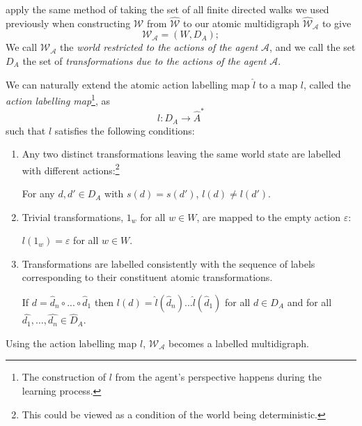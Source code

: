  apply the same method of taking the set of all finite directed walks we used previously when constructing $\mathscr{W}$ from $\hat{\mathscr{W}}$ to our atomic multidigraph $\hat{\mathscr{W}}_{\mathscr{A}}$ to give
\begin{equation}
    \mathscr{W}_{\mathscr{A}} = (W, D_{A});
\end{equation}
We call $\mathscr{W}_{\mathscr{A}}$ the \emph{world restricted to the actions of the agent $\mathscr{A}$}, and we call the set $D_{A}$ the set of \emph{transformations due to the actions of the agent $\mathscr{A}$}.

We can naturally extend the atomic action labelling map $\hat{l}$ to a map $l$, called the \emph{action labelling map}\footnote{
    The construction of $l$ from the agent's perspective happens during the learning process.
}, as
\begin{equation}
    l: D_{A} \to \hat{A}^{*}
\end{equation}
such that $l$ satisfies the following conditions:
\begin{enumerate}
    \item Any two distinct transformations leaving the same world state are labelled with different actions:\footnote{
    This could be viewed as a condition of the world being deterministic.
    }
    \begin{actioncondition}[Uniqueness]\label{actcon:action_gives_single_outcome}
      For any $d,d' \in D_{A}$ with $s(d)=s(d')$, $l(d) \neq l(d')$.
    \end{actioncondition}

    \item Trivial transformations, $1_{w}$ for all $w \in W$, are mapped to the empty action $\varepsilon$:
    \begin{actioncondition}[Identity]\label{actcon:trivial_transformations_mapped_to_empty_sequence}
      $l(1_{w}) = \varepsilon$ for all $w \in W$.
    \end{actioncondition}

    \item Transformations are labelled consistently with the sequence of labels corresponding to their constituent atomic transformations.
    \begin{actioncondition}\label{actcon:composition_consistency}
      If $d = \hat{d}_{n} \circ ... \circ \hat{d}_{1}$ then $l(d) = \hat{l}(\hat{d}_{n}) ... \hat{l}(\hat{d}_{1})$ for all $d \in D_{A}$ and for all $\hat{d_{1}}, \dots , \hat{d_{n}} \in \hat{D}_{A}$.
    \end{actioncondition}
\end{enumerate}
Using the action labelling map $l$, $\mathscr{W}_{\mathscr{A}}$ becomes a labelled multidigraph.

